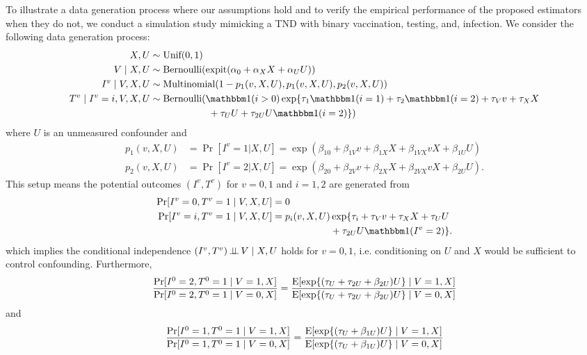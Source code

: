 \documentclass[11pt]{article}
\begin{document}
To illustrate a data generation process where our assumptions hold and to verify the empirical performance of the proposed estimators when they do not, we conduct a simulation study mimicking a TND with binary vaccination, testing, and, infection. We consider the following data generation process:
\begin{align*}
    X, U &\sim \text{Unif}(0,1)\\
    V\mid X, U & \sim \text{Bernoulli}(\expit(\alpha_0 + \alpha_X X + \alpha_U U))\\
    I^v \mid V, X, U &\sim \text{Multinomial}(1-p_1(v, X, U), p_1(v, X, U), p_2(v, X, U))\\
    T^v\mid I^v=i, V, X, U &\sim \text{Bernoulli}(\mathbbm 1(i>0)\exp\{\tau_{1}\mathbbm 1(i=1) + \tau_{2}\mathbbm 1(i=2) + \tau_V v + \tau_X X \\&\qquad \qquad\qquad + \tau_U U + \tau_{2U} U \mathbbm 1(i=2) \})
\end{align*}
where $U$ is an unmeasured confounder and
\begin{align*}
    p_1(v, X, U) & = \Pr[I^v = 1 | X, U] = \exp(\beta_{10} + \beta_{1V}v + \beta_{1X}X + \beta_{1VX}vX + \beta_{1U}U) \\
    p_2(v, X, U) & = \Pr[I^v = 2 | X, U] = \exp(\beta_{20} + \beta_{2V}v + \beta_{2X}X + \beta_{2VX}vX + \beta_{2U}U).
\end{align*}
This setup means the potential outcomes $(I^v, T^v)$ for $v=0,1$ and $i=1, 2$ are generated from
\begin{align*}
    \Pr[I^v=0, T^v=1\mid V, X, U] &= 0\\
    \Pr[I^v=i, T^v=1\mid V, X, U] &= p_i(v, X, U)\exp\{\tau_i + \tau_V v + \tau_X X + \tau_U U \\&\qquad \qquad\qquad + \tau_{2U}U\mathbbm 1(I^v=2) \}.
\end{align*}
which implies the conditional independence $(I^v, T^v)\operatorname{\perp\!\!\!\perp} V\mid X, U$ holds for $v=0,1$, i.e. conditioning on $U$ and $X$ would be sufficient to control confounding. Furthermore, 
\begin{align*}
    \dfrac{\Pr[I^0=2, T^0=1 \mid V=1,X]}{\Pr[I^0=2, T^0=1\mid V=0,X]}=\dfrac{\operatorname{E}[\exp\{(\tau_U  + \tau_{2U}+\beta_{2U})U\}\mid V=1, X]}{\operatorname{E}[\exp\{(\tau_U  + \tau_{2U}+\beta_{2U})U\}\mid V=0, X]}
\end{align*}
and 
\begin{align*}
    \dfrac{\Pr[I^0=1, T^0=1 \mid V=1,X]}{\Pr[I^0=1, T^0=1\mid V=0,X]}=\dfrac{\operatorname{E}[\exp\{(\tau_U  +\beta_{1U})U\}\mid V=1, X]}{\operatorname{E}[\exp\{(\tau_U +\beta_{1U})U\}\mid V=0, X]}
\end{align*}
\end{document}
